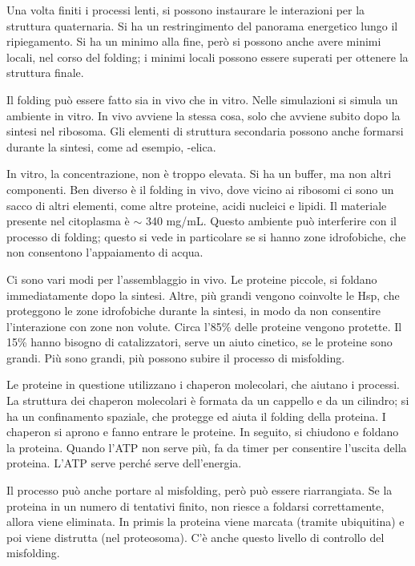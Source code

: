 Una volta finiti i processi lenti, si possono instaurare le interazioni
per la struttura quaternaria.
Si ha un restringimento del panorama energetico lungo il ripiegamento.
Si ha un minimo alla fine, però si possono anche avere minimi locali,
nel corso del folding; i minimi locali possono essere superati per
ottenere la struttura finale.

Il folding può essere fatto sia in vivo che in vitro. Nelle simulazioni
si simula un ambiente in vitro.
In vivo avviene la stessa cosa, solo che avviene subito dopo la sintesi
nel ribosoma. Gli elementi di struttura secondaria possono anche
formarsi durante la sintesi, come ad esempio, \alpha-elica.

In vitro, la concentrazione, non è troppo elevata. Si ha un buffer, ma
non altri componenti. Ben diverso è il folding in vivo, dove vicino ai
ribosomi ci sono un sacco di altri elementi, come altre proteine, acidi
nucleici e lipidi. Il materiale presente nel citoplasma è \(\sim\) 340
mg/mL. Questo ambiente può interferire con il processo di folding; questo
si vede in particolare se si hanno zone idrofobiche, che non consentono
l'appaiamento di acqua.

Ci sono vari modi per l'assemblaggio in vivo.
Le proteine piccole, si foldano immediatamente dopo la sintesi.
Altre, più grandi vengono coinvolte le Hsp, che proteggono le zone
idrofobiche durante la sintesi, in modo da non consentire l'interazione
con zone non volute.
Circa l'85\% delle proteine vengono protette.
Il 15\% hanno bisogno di catalizzatori, serve un aiuto cinetico, se le
proteine sono grandi. Più sono grandi, più possono subire il processo di
misfolding.


Le proteine in questione utilizzano i chaperon molecolari, che aiutano i
processi.
La struttura dei chaperon molecolari è formata da un cappello e da un
cilindro; si ha un confinamento spaziale, che protegge ed aiuta il
folding della proteina.
I chaperon si aprono e fanno entrare le proteine. In seguito, si
chiudono e foldano la proteina.
Quando l’ATP non serve più, fa da timer per consentire l'uscita della
proteina. L'ATP serve perché serve dell'energia.

Il processo può anche portare al misfolding, però può essere
riarrangiata. Se la proteina in un numero di tentativi finito, non
riesce a foldarsi correttamente, allora viene eliminata. In primis la
proteina viene marcata (tramite ubiquitina) e poi viene distrutta (nel
proteosoma). C'è anche questo livello di controllo del misfolding.

